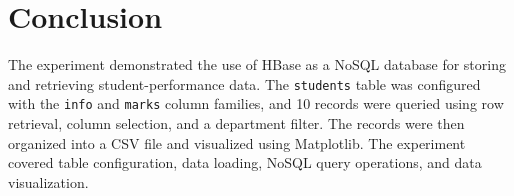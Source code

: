 \documentclass[11pt,a4paper]{article}
\begin{document}
\section{Conclusion}
The experiment demonstrated the use of HBase as a NoSQL database for storing and retrieving student-performance data. The \texttt{students} table was configured with the \texttt{info} and \texttt{marks} column families, and 10 records were queried using row retrieval, column selection, and a department filter. The records were then organized into a CSV file and visualized using Matplotlib. The experiment covered table configuration, data loading, NoSQL query operations, and data visualization.
\end{document}
